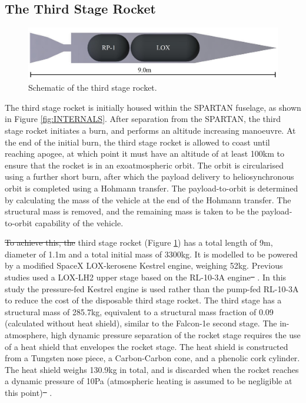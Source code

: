 \documentclass[journal]{new-aiaa}
\providecommand{\DIFadd}[1]{{\protect\color{blue}\uwave{#1}}} %
\providecommand{\DIFdel}[1]{{\protect\color{red}\sout{#1}}}                      %
\providecommand{\DIFaddbegin}{} %
\providecommand{\DIFaddend}{} %
\providecommand{\DIFdelbegin}{} %
\providecommand{\DIFdelend}{} %
\newcommand{\DIFscaledelfig}{0.5}
\newlength{\DIFdelgraphicswidth} %
\newlength{\DIFdelgraphicsheight} %
\newcommand{\DIFaddincludegraphics}[2][]{{\color{blue}\fbox{\DIFOincludegraphics[#1]{#2}}}} %
\newcommand{\DIFdelincludegraphics}[2][]{%
\sbox{\DIFdelgraphicsbox}{\DIFOincludegraphics[#1]{#2}}%
\settoboxwidth{\DIFdelgraphicswidth}{\DIFdelgraphicsbox} %
\settoboxtotalheight{\DIFdelgraphicsheight}{\DIFdelgraphicsbox} %
\scalebox{\DIFscaledelfig}{%
\parbox[b]{\DIFdelgraphicswidth}{\usebox{\DIFdelgraphicsbox}\\[-\baselineskip] \rule{\DIFdelgraphicswidth}{0em}}\llap{\resizebox{\DIFdelgraphicswidth}{\DIFdelgraphicsheight}{%
\setlength{\unitlength}{\DIFdelgraphicswidth}%
\begin{picture}(1,1)%
\thicklines\linethickness{2pt} %
{\color[rgb]{1,0,0}\put(0,0){\framebox(1,1){}}}%
{\color[rgb]{1,0,0}\put(0,0){\line( 1,1){1}}}%
{\color[rgb]{1,0,0}\put(0,1){\line(1,-1){1}}}%
\end{picture}%
}\hspace*{3pt}}} %
} %
\DeclareRobustCommand{\DIFaddbegin}{\DIFOaddbegin \let\includegraphics\DIFaddincludegraphics} %
\DeclareRobustCommand{\DIFaddend}{\DIFOaddend \let\includegraphics\DIFOincludegraphics} %
\DeclareRobustCommand{\DIFdelbegin}{\DIFOdelbegin \let\includegraphics\DIFdelincludegraphics} %
\DeclareRobustCommand{\DIFdelend}{\DIFOaddend \let\includegraphics\DIFOincludegraphics} %
\begin{document}
\subsection{The Third Stage Rocket}\label{section:rocket}
\begin{figure}[ht]
	\centering
	\includegraphics[width=0.6\linewidth]{3rdStage}
	\caption{Schematic of the third stage rocket.}
	\label{fig:ThirdStage}
\end{figure}

The third stage rocket is initially housed within the SPARTAN fuselage, as shown in Figure \ref{fig:INTERNALS}. After separation from the SPARTAN, the third stage rocket initiates a burn, and performs an altitude increasing manoeuvre. 
At the end of the initial burn, the third stage rocket is allowed to coast until reaching apogee, at which point it must have an altitude of at least 100km to ensure that the rocket is in an exoatmospheric orbit. The orbit is circularised using a further short burn, after which the payload delivery to heliosynchronous orbit is completed using a Hohmann transfer. The payload-to-orbit is determined by calculating the mass of the vehicle at the end of the Hohmann transfer. The structural mass is removed, and the remaining mass is taken to be the payload-to-orbit capability of the vehicle. 

\DIFdelbegin \DIFdel{To achieve this, the }\DIFdelend \DIFaddbegin \DIFadd{The }\DIFaddend third stage rocket (Figure \ref{fig:ThirdStage}) has a total length of 9m, diameter of 1.1m and a total initial mass of 3300kg. It is modelled to be powered by a modified SpaceX LOX-kerosene Kestrel engine\cite{Vehicle2008}, weighing 52kg. Previous studies used a LOX-LH2 upper stage based on the RL-10-3A engine\DIFdelbegin \DIFdel{\mbox{%
\cite{Preller2017}}%
}\DIFdelend \DIFaddbegin \DIFadd{\mbox{%
\cite{Preller2017b}}%
}\DIFaddend . In this study the pressure-fed Kestrel engine is used rather than the pump-fed RL-10-3A to reduce the cost of the disposable third stage rocket. The third stage has a structural mass of 285.7kg, equivalent to a structural mass fraction of 0.09 (calculated without heat shield), similar to the Falcon-1e second stage\cite{Vehicle2008}. The in-atmosphere, high dynamic pressure separation of the rocket stage requires the use of a heat shield that envelopes the rocket stage. The heat shield is constructed from a Tungsten nose piece, a Carbon-Carbon cone, and a phenolic cork cylinder. The heat shield weighs 130.9kg in total, and is discarded when the rocket reaches a dynamic pressure of 10Pa (atmospheric heating is assumed to be negligible at this point)\DIFdelbegin \DIFdel{\mbox{%
\cite{Preller2015a,Preller2017}}%
}\DIFdelend \DIFaddbegin \DIFadd{\mbox{%
\cite{Preller2015a,Preller2017b}}%
}\DIFaddend . 
\end{document}

